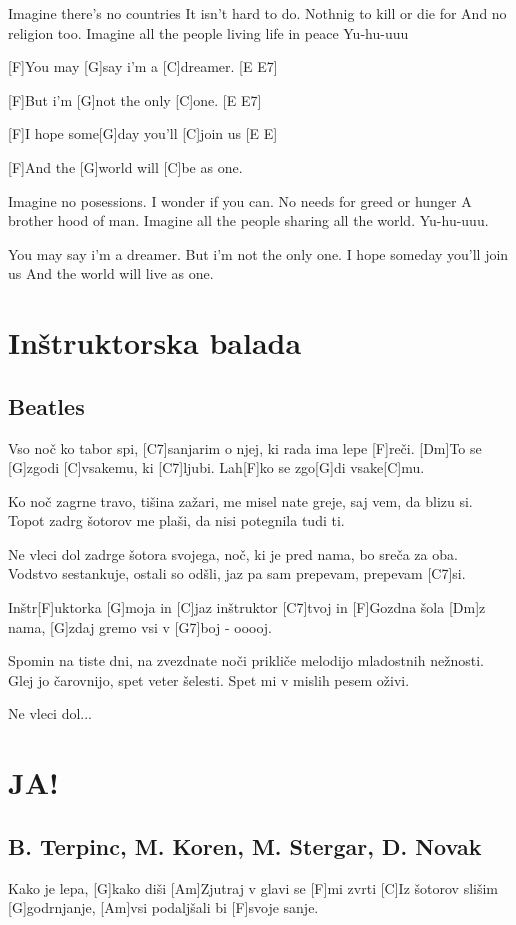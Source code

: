 \documentclass[a4paper,12pt]{article}
\begin{document}
\begin{multicols}{2}
\begin{guitar}
Imagine there's no countries
It isn't hard to do.
Nothnig to kill or die for 
And no religion too.
Imagine all the people living  life in peace 
Yu-hu-uuu


[F]You may [G]say  i'm a [C]dreamer. [E E7]

[F]But i'm [G]not the only [C]one. [E  E7]

[F]I hope some[G]day you'll [C]join us [E  E]

[F]And the [G]world will [C]be as one.


Imagine no posessions.
I wonder if you can.
No needs for greed or hunger 
A brother hood of man.
Imagine all the people sharing all the world.
Yu-hu-uuu.


You may say  i'm a dreamer.
But i'm not the only one.
I hope someday you'll join us 
And the world will live as one.

\end{guitar}
\section{Inštruktorska balada}
\subsection*{Beatles}
\begin{guitar}
[C]Vso noč ko tabor spi, [C7]sanjarim o njej,
ki rada ima lepe [F]reči.
[Dm]To se [G]zgodi [C]vsakemu, ki [C7]ljubi.
Lah[F]ko se zgo[G]di vsake[C]mu.
 

Ko noč zagrne travo, tišina zažari,
me misel nate greje, saj vem, da blizu si.
Topot zadrg šotorov me plaši,
da nisi potegnila tudi ti.

 
Ne vleci dol zadrge šotora svojega,
noč, ki je pred nama, bo sreča za oba.
Vodstvo sestankuje, ostali so odšli,
jaz pa sam prepevam, prepevam [C7]si.	
 

Inštr[F]uktorka [G]moja in [C]jaz inštruktor [C7]tvoj
in [F]Gozdna šola [Dm]z nama, 
[G]zdaj gremo vsi v [G7]boj - ooooj.
 

Spomin na tiste dni, na zvezdnate noči
prikliče melodijo mladostnih nežnosti.
Glej jo čarovnijo, spet veter šelesti.
Spet mi v mislih pesem oživi.


Ne vleci dol...

\end{guitar}
\section{JA!}
\subsection*{B. Terpinc, M. Koren, M. Stergar, D. Novak}
\begin{guitar}
[C]Kako je lepa, [G]kako diši
[Am]Zjutraj v glavi se [F]mi zvrti
[C]Iz šotorov slišim [G]godrnjanje,
[Am]vsi podaljšali bi [F]svoje sanje.



\end{guitar}
\end{multicols}
\end{document}
